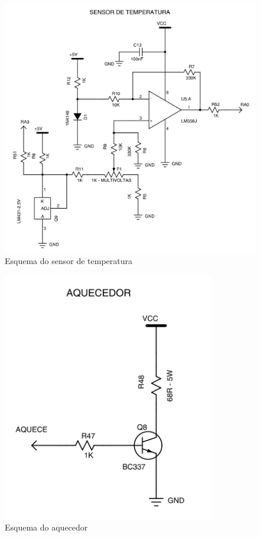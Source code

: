 \documentclass{article}
\begin{document}
\begin{figure}[H]
	\centering
	\includegraphics[width=0.9\linewidth]{esq_sensorTemp}
	\caption{Esquema do sensor de temperatura}
	\label{fig:esq_sesorTemp}
\end{figure}
\begin{figure}[H]
	\centering
	\includegraphics[width=0.9\linewidth]{esq_aquecedor}
	\caption{Esquema do aquecedor}
	\label{fig:esq_aquecedor}
\end{figure}
\end{document}
